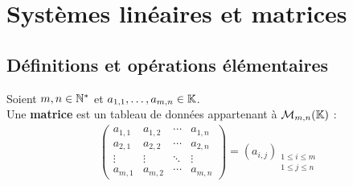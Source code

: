 \chapter{Systèmes linéaires et matrices}
\def\arraystretch{1}

\section{Définitions et opérations élémentaires}
\begin{definition}[Matrice]
	Soient $m,n \in \mathbb{N}^*$ et $a_{1,1}, \ldots, a_{m,n} \in \mathbb{K}$. 
	\\
    Une \textbf{matrice} est un tableau de données appartenant à $\mathcal{M}_{m,n} (\mathbb{K})$ :
    \begin{align*}
        \begin{pmatrix}
            a_{1,1} & a_{1,2} & \cdots & a_{1,n} \\
            a_{2,1} & a_{2,2} & \cdots & a_{2,n} \\
            \vdots & \vdots & \ddots & \vdots \\
            a_{m,1} & a_{m,2} & \cdots & a_{m,n}
        \end{pmatrix}
        = 
        (a_{i,j})_{\substack{1 \leq i \leq m \\ 1 \leq j \leq n}}
    \end{align*}
\end{definition}


